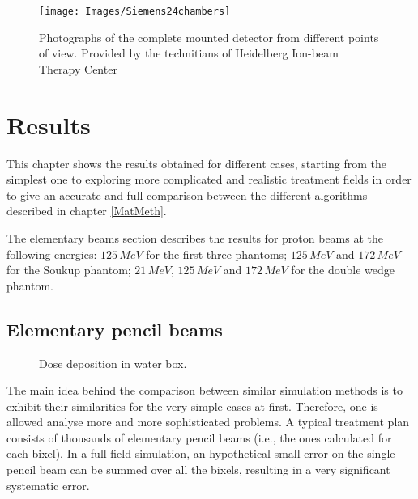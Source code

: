 \documentclass[12pt, a4paper, twoside]{book}
\begin{document}
\begin{figure}[b]
{\texttt{[image: Images/Siemens24chambers]}}
\caption{Photographs of the complete mounted detector from different points of view. Provided by the technitians of Heidelberg Ion-beam Therapy Center}
\label{fig:24cham}
\end{figure}




\chapter{Results} \label{res}%
\label{chap:res}

This chapter shows the results obtained for different cases, starting from the simplest one to exploring more complicated and realistic treatment fields in order to give an accurate and full comparison between the different algorithms described in chapter \ref{MatMeth}. 

The elementary beams section describes the results for proton beams at the following energies: $125\,MeV$ for the first three phantoms; $125\,MeV$ and $172\,MeV$ for the Soukup phantom; $21\,MeV$, $125\,MeV$ and $172\,MeV$ for the double wedge phantom.

\section{Elementary pencil beams}

\begin{figure}[!b]
\centering
{}\quad
{}\quad
{}\quad
\caption{Dose deposition in water box.}
\label{fig:WB1}
\vspace{-20mm}
\end{figure}
The main idea behind the comparison between similar simulation methods is to exhibit their similarities for the very simple cases at first. Therefore, one is allowed analyse more and more sophisticated problems. 
A typical treatment plan consists of thousands of elementary pencil beams (i.e., the ones calculated for each bixel). In a full field simulation, an hypothetical small error on the single pencil beam can be summed over all the bixels, resulting in a very significant systematic error.
\end{document}
